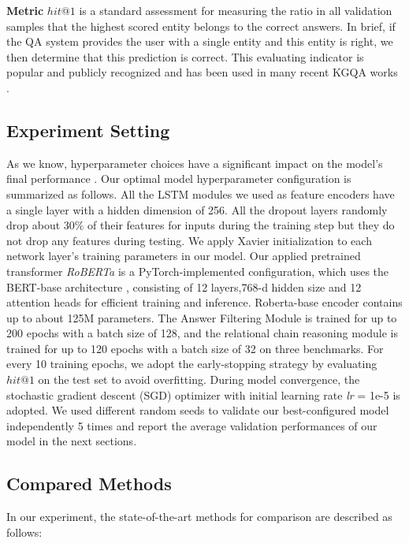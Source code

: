 \documentclass[pdflatex,sn-mathphys]{sn-jnl}%
\theoremstyle{thmstyleone}%
\theoremstyle{thmstyletwo}%
\theoremstyle{thmstylethree}%
\begin{document}
\textbf{Metric} $hit@1$ is a standard assessment for measuring the ratio in all validation samples that the highest scored entity belongs to the correct answers. In brief, if the QA system provides the user with a single entity and this entity is right, we then determine that this prediction is correct. This evaluating indicator is popular and publicly recognized and has been used in many recent KGQA works \cite{apoorv2020embedKGQA,chen2019uhopKGQA,yunshi2020graphKGQA}.


\subsection{Experiment Setting}
As we know, hyperparameter choices have a significant impact on the model's final performance \cite{electronics3zuojwq,cvtassd1zuojwq}. Our optimal model hyperparameter configuration is summarized as follows. All the LSTM modules we used as feature encoders have a single layer with a hidden dimension of 256. All the dropout layers randomly drop about 30\% of their features for inputs during the training step but they do not drop any features during testing. We apply Xavier initialization to each network layer's training parameters in our model.
Our applied pretrained transformer \textit{RoBERTa} is a PyTorch-implemented configuration, which uses the BERT-base architecture \cite{tqx1zuoenhancere,google2018bert}, consisting of 12 layers,768-d hidden size and 12 attention heads for efficient training and inference. Roberta-base encoder \cite{ott2019fairseq,roberta} contains up to about 125M parameters. The Answer Filtering Module is trained for up to 200 epochs with a batch size of 128, and the relational chain reasoning module is trained for up to 120 epochs with a batch size of 32 on three benchmarks. For every 10 training epochs, we adopt the early-stopping strategy by evaluating $hit@1$ on the test set to avoid overfitting. During model convergence, the stochastic gradient descent (SGD) optimizer with initial learning rate \textit{lr} = 1e-5 is adopted. We used different random seeds to validate our best-configured model independently 5 times and report the average validation performances of our model in the next sections.

\subsection{Compared Methods}
In our experiment, the state-of-the-art methods for comparison are described as follows:
\end{document}
